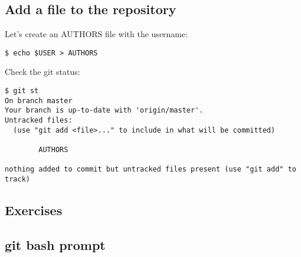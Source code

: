 \subsection{Add a file to the repository}
\begin{frame}[fragile]
  \subslidetitle

  Let's create an AUTHORS file with the username:
  \begin{lstlisting}
$ echo $USER > AUTHORS
  \end{lstlisting}

  Check the git status:
  \begin{lstlisting}
$ git st
On branch master
Your branch is up-to-date with 'origin/master'.
Untracked files:
  (use "git add <file>..." to include in what will be committed)

        AUTHORS

nothing added to commit but untracked files present (use "git add" to track)
  \end{lstlisting}

\end{frame}





\subsection{Exercises}
\begin{frame}[fragile]
  \subslidetitle
\end{frame}

\subsection{git bash prompt}
\begin{frame}[fragile]
  \subslidetitle
\end{frame}
